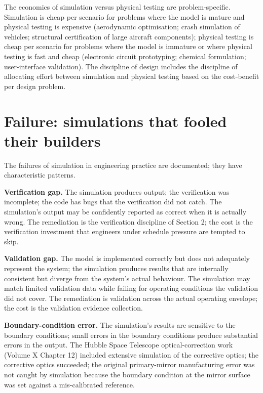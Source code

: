 The economics of simulation versus physical testing are problem-specific. Simulation is cheap per scenario for problems where the model is mature and physical testing is expensive (aerodynamic optimisation; crash simulation of vehicles; structural certification of large aircraft components); physical testing is cheap per scenario for problems where the model is immature or where physical testing is fast and cheap (electronic circuit prototyping; chemical formulation; user-interface validation). The discipline of design includes the discipline of allocating effort between simulation and physical testing based on the cost-benefit per design problem.

\section{Failure: simulations that fooled their builders}

The failures of simulation in engineering practice are documented; they have characteristic patterns.

\textbf{Verification gap.} The simulation produces output; the verification was incomplete; the code has bugs that the verification did not catch. The simulation's output may be confidently reported as correct when it is actually wrong. The remediation is the verification discipline of Section 2; the cost is the verification investment that engineers under schedule pressure are tempted to skip.

\textbf{Validation gap.} The model is implemented correctly but does not adequately represent the system; the simulation produces results that are internally consistent but diverge from the system's actual behaviour. The simulation may match limited validation data while failing for operating conditions the validation did not cover. The remediation is validation across the actual operating envelope; the cost is the validation evidence collection.

\textbf{Boundary-condition error.} The simulation's results are sensitive to the boundary conditions; small errors in the boundary conditions produce substantial errors in the output. The Hubble Space Telescope optical-correction work (Volume X Chapter 12) included extensive simulation of the corrective optics; the corrective optics succeeded; the original primary-mirror manufacturing error was not caught by simulation because the boundary condition at the mirror surface was set against a mis-calibrated reference.

